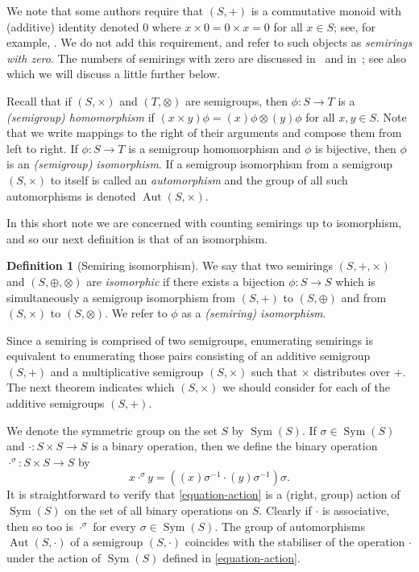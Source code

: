 \documentclass{article}
\theoremstyle{definition}
\newtheorem{defn}{Definition}[section]
\theoremstyle{plain}
\newcommand{\Sym}{\operatorname{Sym}}
\newcommand{\Aut}{\operatorname{Aut}}
\begin{document}
We note that some authors require that $(S, +)$ is a commutative monoid with
(additive) identity denoted $0$ where $x\times 0 = 0 \times x = 0$ for all $x\in
S$; see, for example, \cite{Lothaire2005, Sakarovitch2009}.
We do not add this requirement, and refer to such objects as \textit{semirings
with zero}. The numbers of semirings with zero are discussed
in~\cite{stackexchange} and in~\cite{jipsen}; see
also~\cite{baueralg} which we will discuss a little further below.

Recall that if $(S, \times)$ and $(T, \otimes)$ are semigroups, then $\phi:S
\to T$ is a \textit{(semigroup) homomorphism} if $(x\times y)\phi =
(x)\phi\otimes (y)\phi$ for all $x, y\in S$. Note that we write mappings to the
right of their arguments and compose them from left to right. If $\phi: S \to
T$ is a semigroup homomorphism and $\phi$ is bijective, then $\phi$ is an
\textit{(semigroup) isomorphism}. If a semigroup isomorphism from a semigroup
$(S, \times)$ to itself is called an \textit{automorphism}
and the group of all such automorphisms is denoted $\Aut(S, \times)$.

In this short note we are concerned with counting semirings up to isomorphism,
and so our next definition is that of an isomorphism.

\begin{defn}[Semiring isomorphism]\label{defn-semiring-iso}
  We say that two semirings \((S,+,\times)\) and \((S, \oplus, \otimes)\) are
  \emph{isomorphic} if there exists a bijection \(\phi: S \to S\) which is
  simultaneously a semigroup isomorphism from $(S, +)$ to $(S, \oplus)$ and
  from $(S, \times)$ to $(S, \otimes)$. We refer to $\phi$ as a
  \textit{(semiring) isomorphism}.
\end{defn}

Since a semiring is comprised of two semigroups, enumerating semirings is
equivalent to enumerating those pairs consisting of an additive semigroup $(S,
+)$ and a multiplicative semigroup $(S, \times)$ such that $\times$ distributes
over $+$. The next theorem indicates which $(S, \times)$ we should consider
for each of the additive semigroups $(S, +)$.

We denote the symmetric group on the set $S$ by $\Sym(S)$. If $\sigma\in
\Sym(S)$ and $\cdot: S \times S \to S$ is a binary operation, then we define
the binary operation $\cdot ^ \sigma: S\times S \to S$ by
\begin{equation}\label{equation-action}
  x \cdot ^ \sigma y = ((x)\sigma^{-1} \cdot (y)\sigma ^ {-1})\sigma.
\end{equation}
It is straightforward to verify that \eqref{equation-action} is a (right, group)
action of $\Sym(S)$ on the set of all binary operations on $S$. Clearly if
$\cdot$ is associative, then so too is $\cdot ^ \sigma$ for every $\sigma \in
\Sym(S)$. The group of automorphisms $\Aut(S,\cdot)$ of a
semigroup $(S, \cdot)$ coincides with the stabiliser of the operation $\cdot$
under the action of $\Sym(S)$ defined in \eqref{equation-action}.
\end{document}
